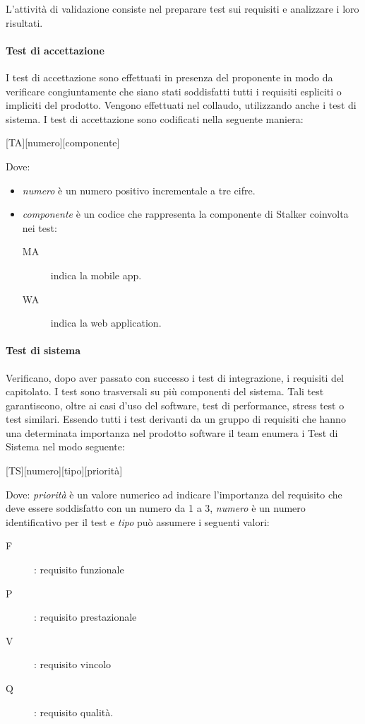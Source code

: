 \documentclass[../../norme-di-progetto.tex]{subfiles}
\begin{document}
L'attività di validazione consiste nel preparare test sui requisiti e analizzare i loro risultati.

\paragraph{Test di accettazione}%
\label{par:test_di_accettazione}

I test di accettazione sono effettuati in presenza del proponente in modo da verificare congiuntamente che siano stati soddisfatti tutti i requisiti espliciti o impliciti del prodotto.
Vengono effettuati nel collaudo, utilizzando anche i test di sistema.
I test di accettazione sono codificati nella seguente maniera:
\begin{center}
    [TA][numero][componente]
\end{center}
Dove:
\begin{itemize}
  \item \textit{numero} è un numero positivo incrementale a tre cifre.
  \item \textit{componente} è un codice che rappresenta la componente di Stalker coinvolta nei test:
    \begin{description}
      \item [MA] indica la mobile app.
      \item [WA] indica la web application.
    \end{description}
\end{itemize}

\paragraph{Test di sistema}%
\label{par:test_di_sistema}

Verificano, dopo aver passato con successo i test di integrazione, i requisiti del capitolato. I test sono trasversali su più componenti del sistema.
Tali test garantiscono, oltre ai casi d'uso del software, test di performance, stress test o test similari.
Essendo tutti i test derivanti da un gruppo di requisiti che hanno una determinata importanza nel prodotto software il team enumera i Test di Sistema nel modo seguente:
\begin{center}
    [TS][numero][tipo][priorità]
\end{center}
Dove: \textit{priorità} è un valore numerico ad indicare l'importanza del requisito che deve essere soddisfatto con un numero da 1 a 3, \textit{numero} è un numero identificativo per il test e \textit{tipo} può assumere i seguenti valori:
\begin{description}
  \item [F]: requisito funzionale
  \item [P]: requisito prestazionale
  \item [V]: requisito vincolo
  \item [Q]: requisito qualità.
\end{description}
\end{document}
